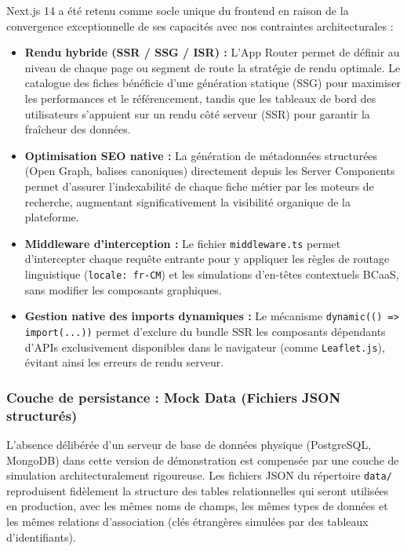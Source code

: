 \documentclass[12pt,a4paper]{report}
\begin{document}
\noindent
Next.js 14 a été retenu comme socle unique du frontend en raison de la convergence exceptionnelle de ses capacités avec nos contraintes architecturales :

\begin{itemize}[leftmargin=1.5cm, itemsep=5pt]
    \item \textbf{Rendu hybride (SSR / SSG / ISR) :} L'App Router permet de définir au niveau de chaque page ou segment de route la stratégie de rendu optimale. Le catalogue des fiches bénéficie d'une génération statique (SSG) pour maximiser les performances et le référencement, tandis que les tableaux de bord des utilisateurs s'appuient sur un rendu côté serveur (SSR) pour garantir la fraîcheur des données.
    \item \textbf{Optimisation SEO native :} La génération de métadonnées structurées (Open Graph, balises canoniques) directement depuis les Server Components permet d'assurer l'indexabilité de chaque fiche métier par les moteurs de recherche, augmentant significativement la visibilité organique de la plateforme.
    \item \textbf{Middleware d'interception :} Le fichier \texttt{middleware.ts} permet d'intercepter chaque requête entrante pour y appliquer les règles de routage linguistique (\texttt{locale: fr-CM}) et les simulations d'en-têtes contextuels BCaaS, sans modifier les composants graphiques.
    \item \textbf{Gestion native des imports dynamiques :} Le mécanisme \texttt{dynamic(() => import(...))} permet d'exclure du bundle SSR les composants dépendants d'APIs exclusivement disponibles dans le navigateur (comme \texttt{Leaflet.js}), évitant ainsi les erreurs de rendu serveur.
\end{itemize}

\subsubsection*{Couche de persistance : Mock Data (Fichiers JSON structurés)}

\noindent
L'absence délibérée d'un serveur de base de données physique (PostgreSQL, MongoDB) dans cette version de démonstration est compensée par une couche de simulation architecturalement rigoureuse. Les fichiers JSON du répertoire \texttt{data/} reproduisent fidèlement la structure des tables relationnelles qui seront utilisées en production, avec les mêmes noms de champs, les mêmes types de données et les mêmes relations d'association (clés étrangères simulées par des tableaux d'identifiants).
\end{document}
